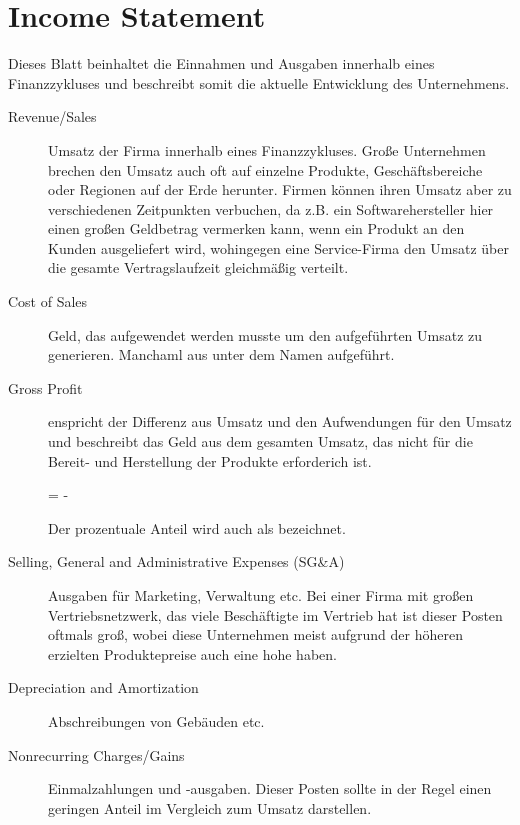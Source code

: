 %
\section{Income Statement}
Dieses Blatt beinhaltet die Einnahmen und Ausgaben innerhalb eines Finanzzykluses und beschreibt somit die aktuelle Entwicklung des Unternehmens.

\begin{description}
    \item[Revenue/Sales] Umsatz der Firma innerhalb eines Finanzzykluses.
        Große Unternehmen brechen den Umsatz auch oft auf einzelne Produkte, Geschäftsbereiche oder Regionen auf der Erde herunter.
        Firmen können ihren Umsatz aber zu verschiedenen Zeitpunkten verbuchen, da z.B. ein Softwarehersteller hier einen großen Geldbetrag vermerken kann, wenn ein Produkt an den Kunden ausgeliefert wird, wohingegen eine Service-Firma den Umsatz über die gesamte Vertragslaufzeit gleichmäßig verteilt.
    \item[Cost of Sales] Geld, das aufgewendet werden musste um den aufgeführten Umsatz zu generieren.
        Manchaml aus unter dem Namen  aufgeführt. 
    \item[Gross Profit] enspricht der Differenz aus Umsatz und den Aufwendungen für den Umsatz und beschreibt das Geld aus dem gesamten Umsatz, das nicht für die Bereit- und Herstellung der Produkte erforderich ist.
        \begin{formel}
             =  - 
        \end{formel}
        Der prozentuale Anteil wird auch als  bezeichnet. 
    \item[Selling, General and Administrative Expenses (SG\&A)] Ausgaben für Marketing, Verwaltung etc.
        Bei einer Firma mit großen Vertriebsnetzwerk, das viele Beschäftigte im Vertrieb hat ist dieser Posten oftmals groß, wobei diese Unternehmen meist aufgrund der höheren erzielten Produktepreise auch eine hohe  haben.
    \item[Depreciation and Amortization] Abschreibungen von Gebäuden etc.
    \item[Nonrecurring Charges/Gains] Einmalzahlungen und -ausgaben.
        Dieser Posten sollte in der Regel einen geringen Anteil im Vergleich zum Umsatz darstellen.

\end{description}

